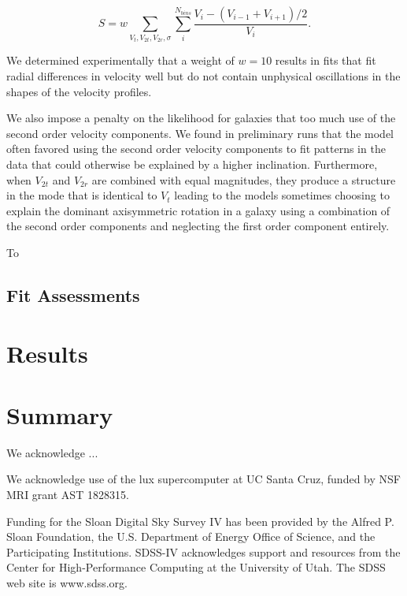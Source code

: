 \begin{equation} \label{smoothing}
    S = w \sum_{V_t, V_{2t}, V_{2r}, \sigma} \sum_{i}^{N_{bins}} \frac{V_i - (V_{i-1} + V_{i+1})/2}{V_i}.
\end{equation}

\noindent We determined experimentally that a weight of $w = 10$ results in fits that fit radial differences in  velocity well but do not contain unphysical oscillations in the shapes of the velocity profiles.

We also impose a penalty on the likelihood for galaxies that too much use of the second order velocity components. We found in preliminary runs that the model often favored using the second order velocity components to fit patterns in the data that could otherwise be explained by a higher inclination. Furthermore, when $V_{2t}$ and $V_{2r}$ are combined with equal magnitudes, they produce a structure in the mode that is identical to $V_t$ leading to the models sometimes choosing to explain the dominant axisymmetric rotation in a galaxy using a combination of the second order components and neglecting the first order component entirely. 

To 

\subsection{Fit Assessments} \label{sec:mocks}

\section{Results}

\section{Summary}



\acknowledgements

We acknowledge ...

We acknowledge use of the lux supercomputer at UC Santa Cruz, funded by NSF MRI grant AST 1828315.

Funding for the Sloan Digital Sky Survey IV has been provided by the
Alfred P. Sloan Foundation, the U.S. Department of Energy Office of
Science, and the Participating Institutions. SDSS-IV acknowledges
support and resources from the Center for High-Performance Computing at
the University of Utah. The SDSS web site is www.sdss.org.

